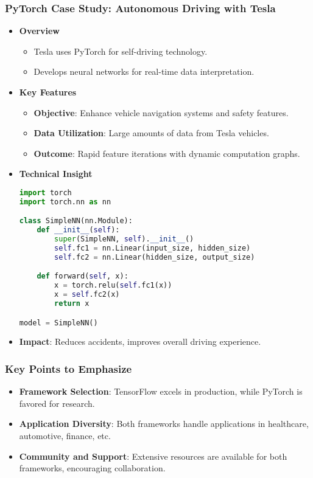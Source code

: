 \documentclass{beamer}
\begin{document}
\begin{frame}[fragile]
    \frametitle{PyTorch Case Study: Autonomous Driving with Tesla}
    \begin{itemize}
        \item \textbf{Overview}
            \begin{itemize}
                \item Tesla uses PyTorch for self-driving technology.
                \item Develops neural networks for real-time data interpretation.
            \end{itemize}
        \item \textbf{Key Features}
            \begin{itemize}
                \item \textbf{Objective}: Enhance vehicle navigation systems and safety features.
                \item \textbf{Data Utilization}: Large amounts of data from Tesla vehicles.
                \item \textbf{Outcome}: Rapid feature iterations with dynamic computation graphs.
            \end{itemize}
        \item \textbf{Technical Insight}
            \begin{lstlisting}[language=Python]
import torch
import torch.nn as nn

class SimpleNN(nn.Module):
    def __init__(self):
        super(SimpleNN, self).__init__()
        self.fc1 = nn.Linear(input_size, hidden_size)
        self.fc2 = nn.Linear(hidden_size, output_size)

    def forward(self, x):
        x = torch.relu(self.fc1(x))
        x = self.fc2(x)
        return x

model = SimpleNN()
            \end{lstlisting}
        \item \textbf{Impact}: Reduces accidents, improves overall driving experience.
    \end{itemize}
\end{frame}

\begin{frame}
    \frametitle{Key Points to Emphasize}
    \begin{itemize}
        \item \textbf{Framework Selection}: TensorFlow excels in production, while PyTorch is favored for research.
        \item \textbf{Application Diversity}: Both frameworks handle applications in healthcare, automotive, finance, etc.
        \item \textbf{Community and Support}: Extensive resources are available for both frameworks, encouraging collaboration.
    \end{itemize}
\end{frame}
\end{document}
